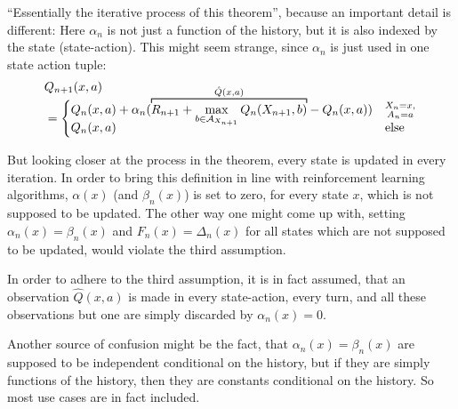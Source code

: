 ``Essentially the iterative process of this theorem'', because an important detail is different: Here \(\alpha_n\) is not just a function of the history, but it is also indexed by the state (state-action). This might seem strange, since \(\alpha_n\) is just used in one state action tuple:
\begin{align*}
    &Q_{n+1}(x,a)\\
    &= \begin{cases}
        Q_n(x,a)+\alpha_n (\smash{
            \overbracket[0.7pt]{
            R_{n+1}+\max_{b\in\cA_{X_{n+1}}}Q_n(X_{n+1},b)
            }^{
                \hat{Q}(x,a)
            }
        } 
        -Q_n(x,a)) & \substack{X_n=x,\\ A_n=a}\\
        Q_n(x,a) & \text{else}
    \end{cases}
\end{align*}

But looking closer at the process in the theorem, every state is updated in every iteration. In order to bring this definition in line with reinforcement learning algorithms, \(\alpha(x)\) (and \(\beta_n(x)\)) is set to zero, for every state \(x\), which is not supposed to be updated. The other way one might come up with, setting \(\alpha_n(x)=\beta_n(x)\) and \(F_n(x)=\Delta_n(x)\) for all states which are not supposed to be updated, would violate the third assumption. 

In order to adhere to the third assumption, it is in fact assumed, that an observation \(\hat{Q}(x,a)\) is made in every state-action, every turn, and all these observations but one are simply discarded by \(\alpha_n(x)=0\).

Another source of confusion might be the fact, that \(\alpha_n(x)=\beta_n(x)\) are supposed to be independent conditional on the history, but if they are simply functions of the history, then they are constants conditional on the history. So most use cases are in fact included. 

